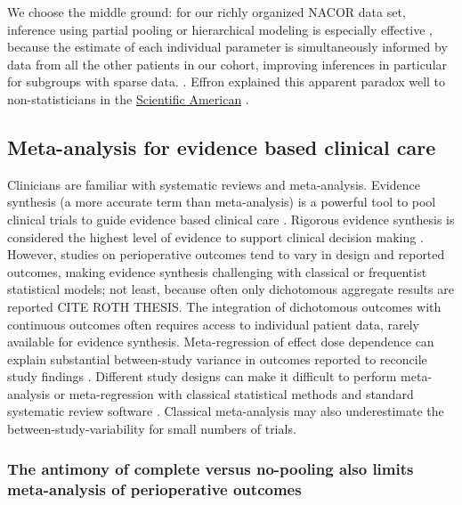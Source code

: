 \documentclass[11pt,notitlepage]{article}
\begin{document}
We choose the middle ground: for our richly organized NACOR data set, inference using partial pooling or hierarchical modeling is especially effective , because the estimate of each individual parameter is simultaneously informed by data from all the other patients in our cohort, improving inferences in particular for subgroups with sparse data. \cite{Gelman2009}. Effron explained this apparent paradox well to non-statisticians in the \href{http://www.nature.com/scientificamerican/journal/v236/n5/pdf/scientificamerican0577-119.pdf}{Scientific American} \cite{Efron_1977,Efron_1977a}. 

\subsection*{Meta-analysis for evidence based clinical care}

Clinicians are familiar with systematic reviews and meta-analysis\cite{Sackett1996}. Evidence synthesis (a more accurate term than meta-analysis) is a powerful tool to pool clinical trials to guide evidence based clinical care \cite{Ashby2000}. Rigorous evidence synthesis is considered the highest level of evidence to support clinical decision making \cite{Cook1997}. However, studies on perioperative outcomes tend to vary in design and reported outcomes\cite{Andreae2013}, making evidence synthesis challenging with classical or frequentist statistical models\cite{Spiegelhalter2000}; not least, because often only dichotomous aggregate results are reported CITE ROTH THESIS.  The integration of dichotomous outcomes with continuous outcomes often requires access to individual patient data, rarely available for evidence synthesis\cite{Andreae2015}. Meta-regression of effect dose dependence can explain substantial between-study variance in outcomes reported to reconcile study findings \cite{Andreae2015,Thompson2002,Abroug2011}. Different study designs can make it difficult to perform meta-analysis or meta-regression with classical statistical methods and standard systematic review software \cite{Deeks2011chapter}. Classical meta-analysis may also underestimate the between-study-variability for small numbers of trials\cite{Song2012,Cornell2014}.

\subsubsection*{The antimony of complete versus no-pooling also limits meta-analysis of perioperative outcomes}
\end{document}
